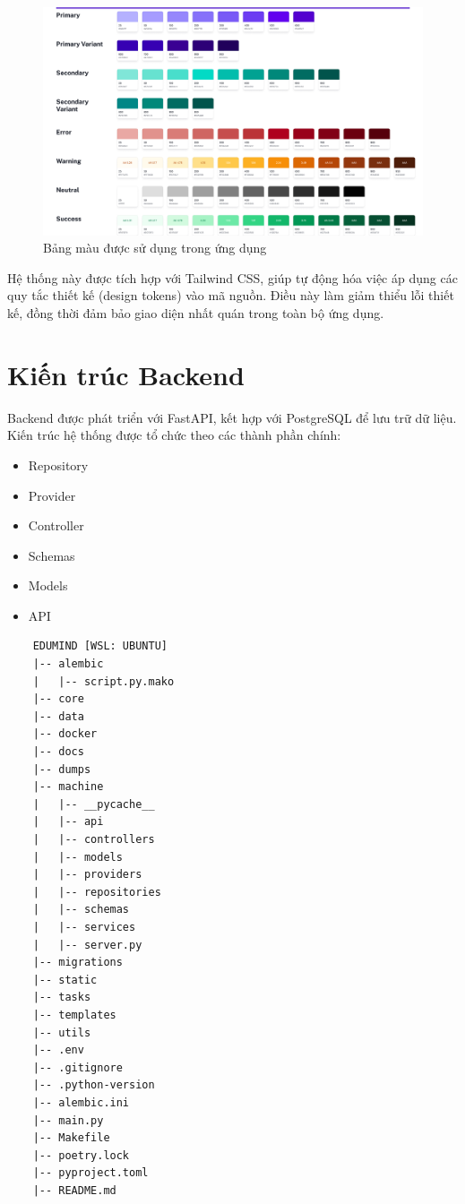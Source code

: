 \begin{figure}[H]
    \centering
    \includegraphics[scale=0.15]{Images/Implement/Colors.jpg}
    \caption{Bảng màu được sử dụng trong ứng dụng}
\end{figure}

Hệ thống này được tích hợp với Tailwind CSS, giúp tự động hóa việc áp dụng các quy tắc thiết kế (design tokens) vào mã nguồn. Điều này làm giảm thiểu lỗi thiết kế, đồng thời đảm bảo giao diện nhất quán trong toàn bộ ứng dụng.

\section{Kiến trúc Backend}

Backend được phát triển với FastAPI, kết hợp với PostgreSQL để lưu trữ dữ liệu. Kiến trúc hệ thống được tổ chức theo các thành phần chính:

\begin{itemize}
    \item Repository
    \item Provider
    \item Controller
    \item Schemas
    \item Models
    \item API
\end{itemize}
\newpage
\begin{verbatim}
    EDUMIND [WSL: UBUNTU]
    |-- alembic
    |   |-- script.py.mako
    |-- core
    |-- data
    |-- docker
    |-- docs
    |-- dumps
    |-- machine
    |   |-- __pycache__
    |   |-- api
    |   |-- controllers
    |   |-- models
    |   |-- providers
    |   |-- repositories
    |   |-- schemas
    |   |-- services
    |   |-- server.py
    |-- migrations
    |-- static
    |-- tasks
    |-- templates
    |-- utils
    |-- .env
    |-- .gitignore
    |-- .python-version
    |-- alembic.ini
    |-- main.py
    |-- Makefile
    |-- poetry.lock
    |-- pyproject.toml
    |-- README.md
    \end{verbatim}

